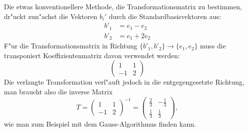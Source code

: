 \begin{diskussion}
Die etwas konventionellere Methode, die Transformationsmatrix zu bestimmen,
dr"uckt zun"achst die Vektoren $b_i'$ durch die Standardbasisvektoren aus:
\begin{align*}
b'_1&=e_1-e_2\\
b'_2&=e_1+2e_2
\end{align*}
F"ur die Transformationsmatrix in Richtung
$\{b'_1,b'_2\}\to\{e_1,e_2\}$ muss die transponiert
Koeffizientenmatrix  davon verwendet werden:
\[
\begin{pmatrix}
1&1\\-1&2
\end{pmatrix}
\]
Die verlangte Transformation verl"auft jedoch in die entgegengesetzte
Richtung, man braucht also die inverse Matrix
\[
T=
\begin{pmatrix}
1&1\\-1&2
\end{pmatrix}^{-1}
=
\begin{pmatrix}
\frac23&-\frac13\\
\frac13&\frac13
\end{pmatrix},
\]
wie man zum Beispiel mit dem Gauss-Algorithmus finden kann.
\end{diskussion}

